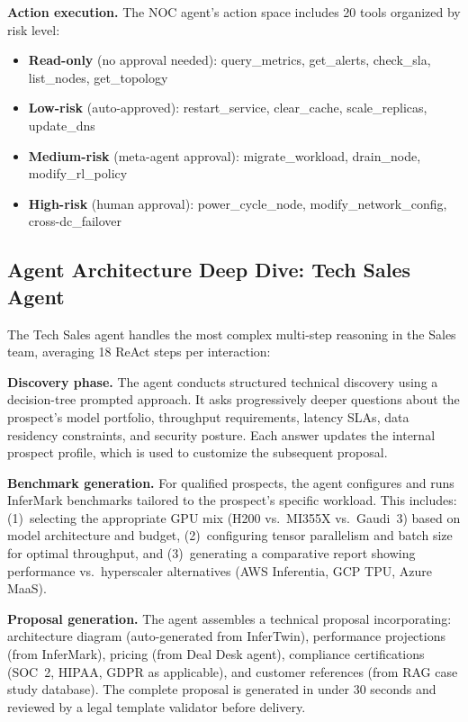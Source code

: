 \documentclass[conference,10pt,letterpaper]{IEEEtran}
\begin{document}
\textbf{Action execution.} The NOC agent's action space includes 20 tools organized by risk level:
\begin{itemize}
\item \textbf{Read-only} (no approval needed): query\_metrics, get\_alerts, check\_sla, list\_nodes, get\_topology
\item \textbf{Low-risk} (auto-approved): restart\_service, clear\_cache, scale\_replicas, update\_dns
\item \textbf{Medium-risk} (meta-agent approval): migrate\_workload, drain\_node, modify\_rl\_policy
\item \textbf{High-risk} (human approval): power\_cycle\_node, modify\_network\_config, cross-dc\_failover
\end{itemize}

\subsection{Agent Architecture Deep Dive: Tech Sales Agent}

The Tech Sales agent handles the most complex multi-step reasoning in the Sales team, averaging 18 ReAct steps per interaction:

\textbf{Discovery phase.} The agent conducts structured technical discovery using a decision-tree prompted approach. It asks progressively deeper questions about the prospect's model portfolio, throughput requirements, latency SLAs, data residency constraints, and security posture. Each answer updates the internal prospect profile, which is used to customize the subsequent proposal.

\textbf{Benchmark generation.} For qualified prospects, the agent configures and runs InferMark benchmarks tailored to the prospect's specific workload. This includes: (1)~selecting the appropriate GPU mix (H200 vs.\ MI355X vs.\ Gaudi~3) based on model architecture and budget, (2)~configuring tensor parallelism and batch size for optimal throughput, and (3)~generating a comparative report showing performance vs.\ hyperscaler alternatives (AWS Inferentia, GCP TPU, Azure MaaS).

\textbf{Proposal generation.} The agent assembles a technical proposal incorporating: architecture diagram (auto-generated from InferTwin), performance projections (from InferMark), pricing (from Deal Desk agent), compliance certifications (SOC~2, HIPAA, GDPR as applicable), and customer references (from RAG case study database). The complete proposal is generated in under 30 seconds and reviewed by a legal template validator before delivery.
\end{document}
